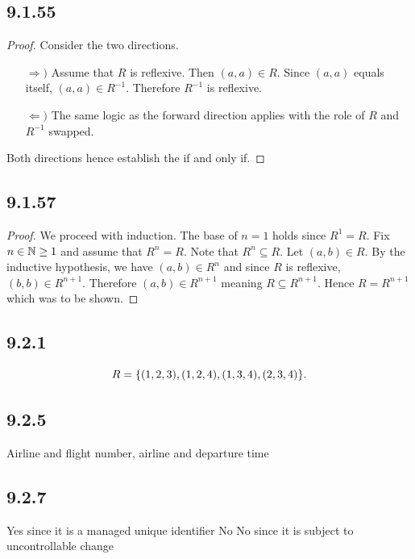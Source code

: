 \documentclass[12pt,titlepage]{extarticle}
\begin{document}
\subsection*{9.1.55}
\begin{proof}
    Consider the two directions.
    \begin{enumerate}
        \item[$\Rightarrow)$]
            Assume that $R$ is reflexive. Then $(a,a) \in R$. Since $(a,a)$ equals itself, $(a,a) \in R^{-1}$. Therefore $R^{-1}$ is reflexive.
        \item[$\Leftarrow)$]
            The same logic as the forward direction applies with the role of $R$ and $R^{-1}$ swapped.
    \end{enumerate}
    Both directions hence establish the if and only if.
\end{proof}

\subsection*{9.1.57}
\begin{proof}
    We proceed with induction. The base of $n = 1$ holds since $R^1 = R$. Fix $n \in \mathbb{N} \geq 1$ and assume that $R^n = R$. Note that $R^n \subseteq R$. Let $(a,b) \in R$. By the inductive hypothesis, we have $(a,b) \in R^n$ and since $R$ is reflexive, $(b,b) \in R^{n+1}$. Therefore $(a,b) \in R^{n+1}$ meaning $R \subseteq R^{n+1}$. Hence $R = R^{n+1}$ which was to be shown.
\end{proof}

\subsection*{9.2.1}
\[
    R = \qty{
        (1, 2, 3), (1, 2, 4), (1, 3, 4), (2, 3, 4)
    }
.\]

\subsection*{9.2.5}
Airline and flight number, airline and departure time

\subsection*{9.2.7}
\begin{tasks}
    \task Yes since it is a managed unique identifier
    \task No
    \task No since it is subject to uncontrollable change
\end{tasks}
\end{document}
